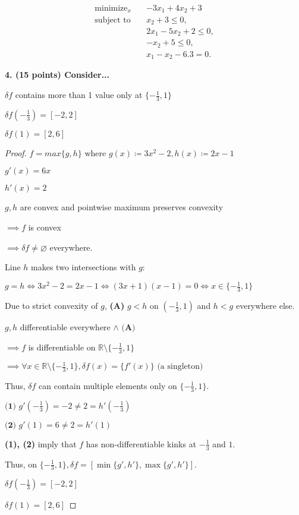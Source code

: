 \documentclass[a4paper,10pt]{article}
\theoremstyle{definition}
\begin{document}
\[
\begin{aligned}
    \text{minimize}_{x} \quad & -3x_1 + 4x_2 + 3 \\
    \text{subject to} \quad & x_2 + 3 \leq 0, \\
                            & 2x_1 - 5x_2 + 2 \leq 0, \\
                            & -x_2 + 5 \leq 0, \\
                            & x_1 - x_2 - 6.3 = 0.
\end{aligned}
\]

\bigskip
\textbf{4. (15 points) Consider...}

$\delta f$ contains more than 1 value only at $\{-\frac{1}{3}, 1\}$

$\delta f(-\frac{1}{3}) = [-2, 2]$

$\delta f(1) = [2, 6]$

\begin{proof}

$f = max\{g, h\} \text{ where } g(x) \coloneq 3x^2 - 2, h(x) \coloneq 2x - 1$

$g'(x) = 6x$

$h'(x) = 2$

$g,h$ are convex and pointwise maximum preserves convexity

$\implies f$ is convex

$\implies \delta f \neq \varnothing$ everywhere.

Line $h$ makes two intersections with $g$:

$g = h \iff 3x^2 - 2 = 2x - 1 \iff (3x + 1)(x - 1) = 0 \iff x \in \{-\frac{1}{3}, 1\}$

Due to strict convexity of $g$, \textbf{(A)} $g < h$ on $(-\frac{1}{3}, 1)$ and $h < g$ everywhere else.

$g, h$ differentiable everywhere $\land \textbf{ (A)}$

$\implies f$ is differentiable on $\mathbb{R} \setminus \{-\frac{1}{3}, 1\}$

$\implies \forall x \in \mathbb{R} \setminus \{-\frac{1}{3}, 1\}, \delta f(x) = \{f'(x)\} \text{ (a singleton)}$

Thus, $\delta f$ can contain multiple elements only on $\{-\frac{1}{3}, 1\}$.

$\textbf{(1) } g'(-\frac{1}{3}) = -2 \neq 2 = h'(-\frac{1}{3})$

$\textbf{(2) } g'(1) = 6 \neq 2 = h'(1)$

\textbf{(1), (2)} imply that $f$ has non-differentiable kinks at $-\frac{1}{3}$ and $1$.

Thus, on $\{-\frac{1}{3}, 1\}, \delta f = [\min\{g', h'\},\max\{g', h'\}]$.

$\delta f(-\frac{1}{3}) = [-2, 2]$

$\delta f(1) = [2, 6]$

\end{proof}
\end{document}
